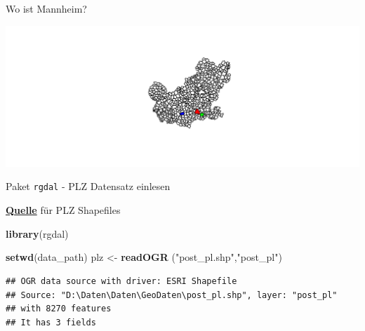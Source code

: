 \documentclass[ignorenonframetext,]{beamer}
\newenvironment{Shaded}{\begin{snugshade}}{\end{snugshade}}
\newcommand{\KeywordTok}[1]{\textcolor[rgb]{0.13,0.29,0.53}{\textbf{#1}}}
\newcommand{\DataTypeTok}[1]{\textcolor[rgb]{0.13,0.29,0.53}{#1}}
\newcommand{\StringTok}[1]{\textcolor[rgb]{0.31,0.60,0.02}{#1}}
\newcommand{\OperatorTok}[1]{\textcolor[rgb]{0.81,0.36,0.00}{\textbf{#1}}}
\newcommand{\NormalTok}[1]{#1}
\begin{document}
\begin{frame}[fragile]{Wo ist Mannheim?}

\begin{Shaded}
\end{Shaded}

\includegraphics{slides_all2gether_part1_files/figure-beamer/unnamed-chunk-143-1.pdf}

\end{frame}

\begin{frame}[fragile]{Paket \texttt{rgdal} - PLZ Datensatz einlesen}

\begin{block}{\href{http://arnulf.us/PLZ}{\textbf{Quelle}} für PLZ
Shapefiles}

\begin{Shaded}
\begin{Highlighting}[]
\KeywordTok{library}\NormalTok{(rgdal)}
\end{Highlighting}
\end{Shaded}

\begin{Shaded}
\begin{Highlighting}[]
\KeywordTok{setwd}\NormalTok{(data_path)}
\NormalTok{plz <-}\StringTok{ }\KeywordTok{readOGR}\NormalTok{ (}\StringTok{"post_pl.shp"}\NormalTok{,}\StringTok{"post_pl"}\NormalTok{)}
\end{Highlighting}
\end{Shaded}

\begin{verbatim}
## OGR data source with driver: ESRI Shapefile 
## Source: "D:\Daten\Daten\GeoDaten\post_pl.shp", layer: "post_pl"
## with 8270 features
## It has 3 fields
\end{verbatim}

\end{block}

\end{frame}
\end{document}
